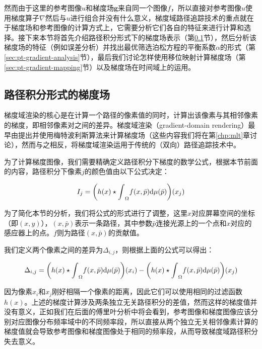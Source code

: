 然而由于这里的参考图像$u$和梯度场$\mathbf{g}$来自同一个图像$f$，所以直接对参考图像$u$使用梯度算子$\nabla$然后与$u$进行组合并没有什么意义，梯度域路径追踪技术的重点就在于梯度场和参考图像的计算方式上，它需要分析它们各自的特征来进行计算和选择。接下来本节将首先介绍路径积分形式下的梯度场表示（第\ref{sec:pt-gradient-form}节），然后分析该梯度场的特征（例如误差分析）并找出最优筛选泊松方程的平衡系数$\alpha$的形式（第\ref{sec:pt-gradient-analysis}节），最后我们讨论怎样使用移位映射计算梯度场（第\ref{sec:pt-gradient-mapping}节）以及梯度场在时间域上的运用。





\subsection{路径积分形式的梯度场}\label{sec:pt-gradient-form}
梯度域渲染的核心是在计算一个路径的像素值的同时，计算出该像素与其相邻像素的梯度，即相邻像素对之间的差异。梯度域渲染（gradient-domain rendering）最早由\cite{a:GradientDomainMetropolisLightTransport}提出并使用梅特波利斯算法来计算梯度场（这些内容我们将在第\ref{chp:mlt}章讨论），然而与之相反，\cite{a:GradientDomainPathTracing,a:Gradient-DomainBidirectionalPathTracing}将梯度域渲染运用于传统的（双向）路径追踪技术中。

为了计算梯度图像，我们需要精确定义路径积分下梯度的数学公式，根据本节前面的内容，路径积分下像素$j$的颜色值由以下公式决定：

\begin{equation}
	I_j=\bigg(h(x)\star{\rm \int}_\Omega f(x, \bar{p}){\rm d}\mu(\bar{p})  \bigg)(x_j)
\end{equation}

\noindent 为了简化本节的分析，我们将公式的形式进行了调整，这里$x$对应屏幕空间的坐标（即$(x,y)$），$(x,\bar{p})$表示一条路径，其中参数$\bar{p}$连接光源上的一个点和$x$对应的感应器上的点。$f$则为路径$(x,\bar{p})$的贡献值。 

我们定义两个像素之间的差异为$\Delta_{i,j}$，则根据上面的公式可以得出：

\begin{equation}
	\Delta_{i,j}=\bigg(h(x)\star{\rm \int}_\Omega f(x, \bar{p}){\rm d}\mu(\bar{p})  \bigg)(x_i)-\bigg(h(x)\star{\rm \int}_\Omega f(x, \bar{p}){\rm d}\mu(\bar{p})  \bigg)(x_j)
\end{equation}

\noindent 因为像素$x_i$和$x_j$刚好相隔一个像素的距离，因此它们可以使用相同的过滤函数$h(x)$。上述的梯度计算涉及两条独立无关路径积分的差值，然而这样的梯度值并没有意义，正如我们在后面的傅里叶分析中将会看到，参考图像和梯度图像应该分别对应图像分布频率域中的不同频率段，所以直接从两个独立无关相邻像素计算的梯度值就会导致参考图像和梯度图像处于相同的频率段，从而导致梯度域路径积分失去意义。

